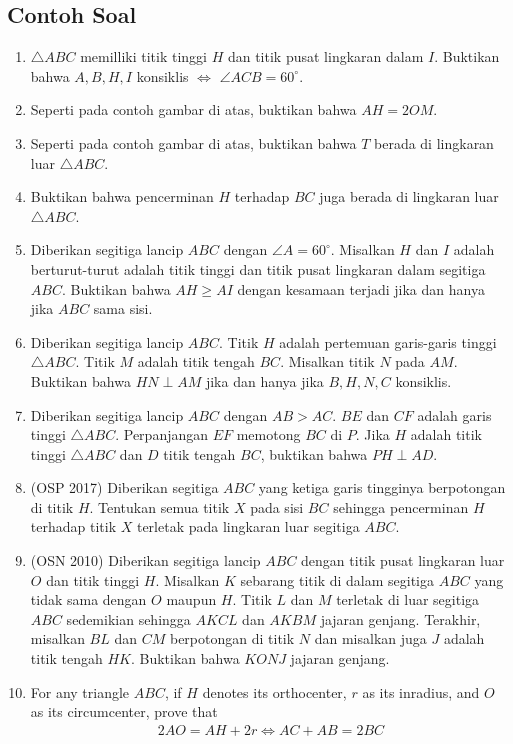 \documentclass[12pt, letter]{scrartcl}
\begin{document}
\subsection{Contoh Soal}
\begin{enumerate}

\item $\triangle ABC$ memilliki titik tinggi $H$ dan titik pusat lingkaran dalam $I$. Buktikan bahwa $A,B,H,I$ konsiklis $\iff$ $\angle ACB = 60^\circ$.

\item Seperti pada contoh gambar di atas, buktikan bahwa $AH=2OM$.

\item Seperti pada contoh gambar di atas, buktikan bahwa $T$ berada di lingkaran luar $\triangle ABC$.

\item Buktikan bahwa pencerminan $H$ terhadap $BC$ juga berada di lingkaran luar $\triangle ABC$.

 \item Diberikan segitiga lancip $ABC$ dengan $\angle A = 60^\circ$. Misalkan $H$ dan $I$ adalah berturut-turut adalah titik tinggi dan titik pusat lingkaran dalam segitiga $ABC$. Buktikan bahwa $AH \ge AI$ dengan kesamaan terjadi jika dan hanya jika $ABC$ sama sisi.

 \item Diberikan segitiga lancip $ABC$. Titik $H$ adalah pertemuan garis-garis tinggi $\triangle ABC$. Titik $M$ adalah titik tengah  $BC$. Misalkan titik $N$ pada $AM$. Buktikan bahwa $HN \perp AM$ jika dan hanya jika $B,H,N,C$ konsiklis.

 \item Diberikan segitiga lancip $ABC$ dengan $AB>AC$. $BE$ dan $CF$ adalah garis tinggi $\triangle ABC$. Perpanjangan $EF$ memotong $BC$ di $P$. Jika $H$ adalah titik tinggi $\triangle ABC$ dan $D$ titik tengah $BC$, buktikan bahwa $PH \perp AD$.

 \item (OSP 2017) Diberikan segitiga $ABC$ yang ketiga garis tingginya berpotongan di titik $H$. Tentukan semua titik $X$ pada sisi $BC$ sehingga pencerminan $H$ terhadap titik $X$ terletak pada lingkaran luar segitiga $ABC$.

 \item (OSN 2010) Diberikan segitiga lancip $ABC$ dengan titik pusat lingkaran luar $O$ dan titik tinggi $H$. Misalkan $K$ sebarang titik di dalam segitiga $ABC$ yang tidak sama dengan $O$ maupun $H$. Titik $L$ dan $M$ terletak di luar segitiga $ABC$ sedemikian sehingga $AKCL$ dan $AKBM$ jajaran genjang. Terakhir, misalkan $BL$ dan $CM$ berpotongan di titik $N$ dan misalkan juga $J$ adalah titik tengah $HK$. Buktikan bahwa $KONJ$ jajaran genjang.

 \item For any triangle $ABC$, if $H$ denotes its orthocenter, $r$ as its inradius, and $O$ as its circumcenter, prove that 
 \begin{align*}
     2AO = AH + 2r \iff AC+AB=2BC
 \end{align*}
 \end{enumerate}
\end{document}
